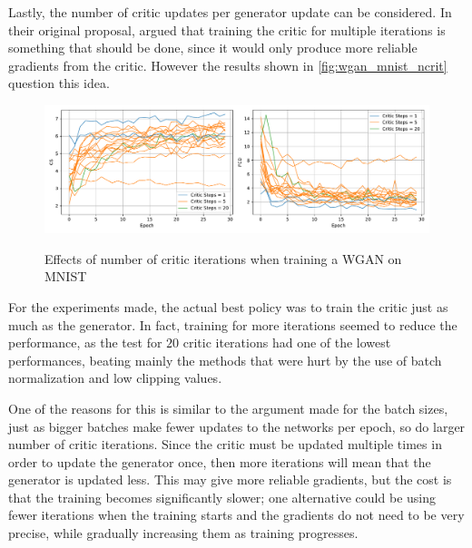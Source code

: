 Lastly, the number of critic updates per generator update can be considered. In their original proposal, \textcite{wasserstein2017} argued that training the critic for multiple iterations is something that should be done, since it would only produce more reliable gradients from the critic. However the results shown in \autoref{fig:wgan_mnist_ncrit} question this idea.
\begin{figure}[hbt]
    \centering
    \caption{Effects of number of critic iterations when training a WGAN on MNIST}
    \includegraphics[width=\textwidth]{chapters/Experiments/WGAN/mnist_ncrit.pdf}
    \label{fig:wgan_mnist_ncrit}
\end{figure}

For the experiments made, the actual best policy was to train the critic just as much as the generator. In fact, training for more iterations seemed to reduce the performance, as the test for $20$ critic iterations had one of the lowest performances, beating mainly the methods that were hurt by the use of batch normalization and low clipping values.

One of the reasons for this is similar to the argument made for the batch sizes, just as bigger batches make fewer updates to the networks per epoch, so do larger number of critic iterations. Since the critic must be updated multiple times in order to update the generator once, then more iterations will mean that the generator is updated less. This may give more reliable gradients, but the cost is that the training becomes significantly slower; one alternative could be using fewer iterations when the training starts and the gradients do not need to be very precise, while gradually increasing them as training progresses.

